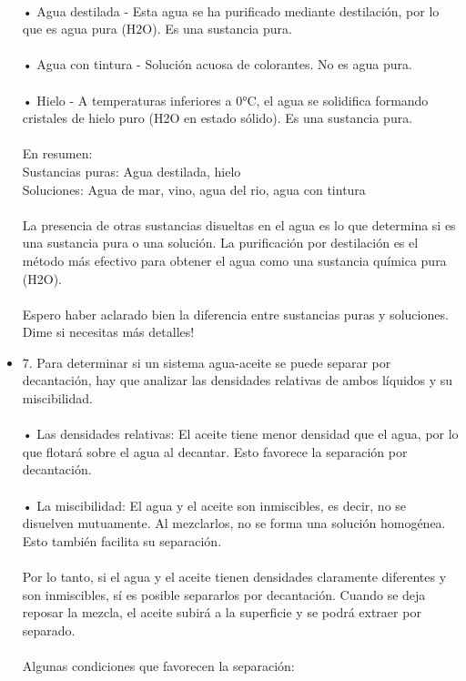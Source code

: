 \documentclass{article}
\begin{document}
\begin{itemize}
\\
• Agua destilada - Esta agua se ha purificado mediante destilación, por lo que es agua pura (H2O). Es una sustancia pura.\\
\\
• Agua con tintura - Solución acuosa de colorantes. No es agua pura.\\
\\
• Hielo - A temperaturas inferiores a 0°C, el agua se solidifica formando cristales de hielo puro (H2O en estado sólido). Es una sustancia pura.\\
\\
En resumen:\\
Sustancias puras: Agua destilada, hielo\\
Soluciones: Agua de mar, vino, agua del rio, agua con tintura\\
\\
La presencia de otras sustancias disueltas en el agua es lo que determina si es una sustancia pura o una solución. La purificación por destilación es el método más efectivo para obtener el agua como una sustancia química pura (H2O).\\
\\
Espero haber aclarado bien la diferencia entre sustancias puras y soluciones. Dime si necesitas más detalles!\\
\item{7.}
Para determinar si un sistema agua-aceite se puede separar por decantación, hay que analizar las densidades relativas de ambos líquidos y su miscibilidad.\\
\\
• Las densidades relativas: El aceite tiene menor densidad que el agua, por lo que flotará sobre el agua al decantar. Esto favorece la separación por decantación.\\
\\
• La miscibilidad: El agua y el aceite son inmiscibles, es decir, no se disuelven mutuamente. Al mezclarlos, no se forma una solución homogénea. Esto también facilita su separación.\\
\\
Por lo tanto, si el agua y el aceite tienen densidades claramente diferentes y son inmiscibles, sí es posible separarlos por decantación. Cuando se deja reposar la mezcla, el aceite subirá a la superficie y se podrá extraer por separado.\\
\\
Algunas condiciones que favorecen la separación:\\

\end{itemize}
\end{document}
